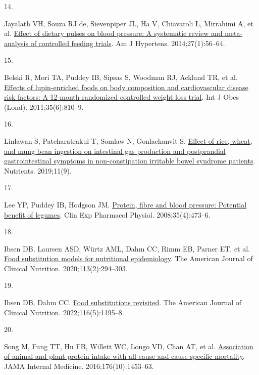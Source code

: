 \documentclass[
  11pt,
  a4paper,
  DIV=11,
  numbers=noendperiod,
  twocolumn]{scrartcl}
\newlength{\cslhangindent}
\newlength{\csllabelwidth}
\newlength{\cslentryspacingunit} %
\newenvironment{CSLReferences}[2] %
 {%
  \setlength{\parindent}{0pt}
  \ifodd #1
  \let\oldpar\par
  \def\par{\hangindent=\cslhangindent\oldpar}
  \fi
  \setlength{\parskip}{#2\cslentryspacingunit}
 }%
 {}
\newcommand{\CSLLeftMargin}[1]{\parbox[t]{\csllabelwidth}{#1}}
\newcommand{\CSLRightInline}[1]{\parbox[t]{\linewidth - \csllabelwidth}{#1}\break}
\begin{document}
\begin{CSLReferences}{0}{0}
\leavevmode{}%
\CSLLeftMargin{14. }%
\CSLRightInline{Jayalath VH, Souza RJ de, Sievenpiper JL, Ha V,
Chiavaroli L, Mirrahimi A, et al.
\href{https://doi.org/10.1093/ajh/hpt155}{Effect of dietary pulses on
blood pressure: A systematic review and meta-analysis of controlled
feeding trials}. Am J Hypertens. 2014;27(1):56--64. }

\leavevmode{}%
\CSLLeftMargin{15. }%
\CSLRightInline{Belski R, Mori TA, Puddey IB, Sipsas S, Woodman RJ,
Ackland TR, et al. \href{https://doi.org/10.1038/ijo.2010.213}{Effects
of lupin-enriched foods on body composition and cardiovascular disease
risk factors: A 12-month randomized controlled weight loss trial}. Int J
Obes (Lond). 2011;35(6):810--9. }

\leavevmode{}%
\CSLLeftMargin{16. }%
\CSLRightInline{Linlawan S, Patcharatrakul T, Somlaw N, Gonlachanvit S.
\href{https://doi.org/10.3390/nu11092061}{Effect of rice, wheat, and
mung bean ingestion on intestinal gas production and postprandial
gastrointestinal symptoms in non-constipation irritable bowel syndrome
patients}. Nutrients. 2019;11(9). }

\leavevmode{}%
\CSLLeftMargin{17. }%
\CSLRightInline{Lee YP, Puddey IB, Hodgson JM.
\href{https://doi.org/10.1111/j.1440-1681.2008.04899.x}{Protein, fibre
and blood pressure: Potential benefit of legumes}. Clin Exp Pharmacol
Physiol. 2008;35(4):473--6. }

\leavevmode{}%
\CSLLeftMargin{18. }%
\CSLRightInline{Ibsen DB, Laursen ASD, Würtz AML, Dahm CC, Rimm EB,
Parner ET, et al. \href{https://doi.org/10.1093/ajcn/nqaa315}{Food
substitution models for nutritional epidemiology}. The American Journal
of Clinical Nutrition. 2020;113(2):294--303. }

\leavevmode{}%
\CSLLeftMargin{19. }%
\CSLRightInline{Ibsen DB, Dahm CC.
\href{https://doi.org/10.1093/ajcn/nqac222}{Food substitutions
revisited}. The American Journal of Clinical Nutrition.
2022;116(5):1195--8. }

\leavevmode{}%
\CSLLeftMargin{20. }%
\CSLRightInline{Song M, Fung TT, Hu FB, Willett WC, Longo VD, Chan AT,
et al.
\href{https://doi.org/10.1001/jamainternmed.2016.4182}{Association of
animal and plant protein intake with all-cause and cause-specific
mortality}. JAMA Internal Medicine. 2016;176(10):1453--63. }


\end{CSLReferences}
\end{document}
